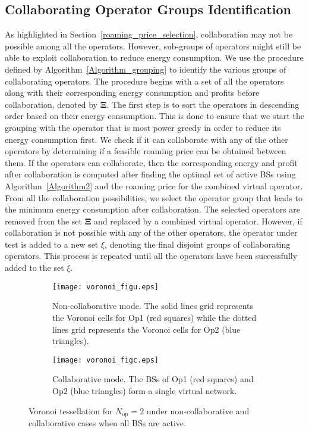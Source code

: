 \documentclass[10pt, letter, twocolumn]{IEEEtran}
\begin{document}
\subsection{Collaborating Operator Groups Identification} \label{sec_grouping}
As highlighted in Section~\ref{roaming_price_selection}, collaboration may not be possible among all the operators. However, sub-groups of operators might still be able to exploit collaboration to reduce energy consumption. We use the procedure defined by Algorithm~\ref{Algorithm_grouping} to identify the various groups of collaborating operators. The procedure begins with a set of all the operators along with their corresponding energy consumption and profits before collaboration, denoted by $\mathbf{\Xi}$. The first step is to sort the operators in descending order based on their energy consumption. This is done to ensure that we start the grouping with the operator that is most power greedy in order to reduce its energy consumption first. We check if it can collaborate with any of the other operators by determining if a feasible roaming price can be obtained between them. If the operators can collaborate, then the corresponding energy and profit after collaboration is computed after finding the optimal set of active BSs using Algorithm~\ref{Algorithm2} and the roaming price for the combined virtual operator. From all the collaboration possibilities, we select the operator group that leads to the minimum energy consumption after collaboration. The selected operators are removed from the set $\mathbf{\Xi}$ and replaced by a combined virtual operator. However, if collaboration is not possible with any of the other operators, the operator under test is added to a new set $\xi$, denoting the final disjoint groups of collaborating operators. This process is repeated until all the operators have been successfully added to the set $\xi$.
\begin{figure}[]
\begin{subfigure}[t]{.45\textwidth}
  \centering
    \texttt{[image: voronoi\_figu.eps]}\vspace{-0.3cm}
    \caption{Non-collaborative mode. The solid lines grid represents the Voronoi cells for Op1 (red squares) while the dotted lines grid represents the Voronoi cells for Op2 (blue triangles).}
    \label{uncoop_fig}
  \end{subfigure}\hfill
  \begin{subfigure}[t]{.45\textwidth}
  \centering
    \texttt{[image: voronoi\_figc.eps]}\vspace{-0.3cm}
    \caption{Collaborative mode. The BSs of Op1 (red squares) and Op2 (blue triangles) form a single virtual network.}
    \label{coop_fig}
  \end{subfigure}
	\vspace{-0.1cm}
\caption{Voronoi tessellation for $N_{\text{op}} = 2$ under non-collaborative and collaborative cases when all BSs are active.}
\label{voronoi_fig}
\end{figure}
\end{document}
